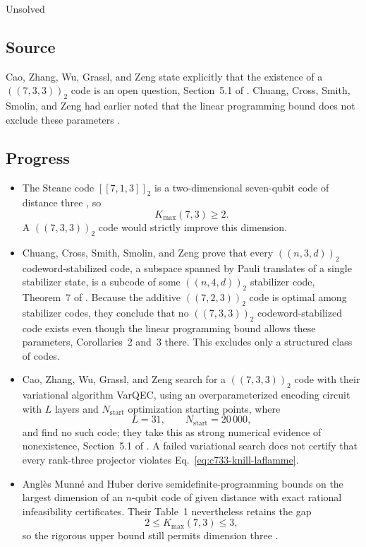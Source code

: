 Unsolved

\subsection*{Source}

Cao, Zhang, Wu, Grassl, and Zeng state explicitly that the existence of a
$((7,3,3))_2$ code is an open question, Section~5.1 of
.  Chuang, Cross, Smith, Smolin, and
Zeng had earlier noted that the linear programming bound does not exclude
these parameters .

\subsection*{Progress}

\begin{itemize}
  \item The Steane code $[[7,1,3]]_2$ is a two-dimensional seven-qubit code of
distance three , so
\begin{equation}
  K_{\max}(7,3)\geq2.
  \label{eq:c733-steane}
\end{equation}
A $((7,3,3))_2$ code would strictly improve this dimension.

  \item Chuang, Cross, Smith, Smolin, and Zeng prove that every $((n,3,d))_2$
codeword-stabilized code, a subspace spanned by Pauli translates of a
single stabilizer state, is a subcode of some $((n,4,d))_2$ stabilizer
code, Theorem~7 of .  Because the
additive $((7,2,3))_2$ code is optimal among stabilizer codes, they
conclude that no $((7,3,3))_2$ codeword-stabilized code exists even though
the linear programming bound allows these parameters, Corollaries~2
and~3 there.  This excludes only a structured class of codes.

  \item Cao, Zhang, Wu, Grassl, and Zeng search for a $((7,3,3))_2$ code with
their variational algorithm VarQEC, using an overparameterized encoding
circuit with $L$ layers and $N_{\mathrm{start}}$ optimization starting
points, where
\begin{equation}
  L=31,
  \qquad
  N_{\mathrm{start}}=20\,000,
  \label{eq:c733-search}
\end{equation}
and find no such code; they take this as strong numerical evidence of
nonexistence, Section~5.1 of .  A
failed variational search does not certify that every rank-three projector
violates Eq.~\eqref{eq:c733-knill-laflamme}.

  \item Angl\`es Munn\'e and Huber derive semidefinite-programming bounds on the
largest dimension of an $n$-qubit code of given distance with exact
rational infeasibility certificates.  Their Table~1 nevertheless retains
the gap
\begin{equation}
  2\leq K_{\max}(7,3)\leq3,
  \label{eq:c733-gap}
\end{equation}
so the rigorous upper bound still permits dimension three
.
\end{itemize}

